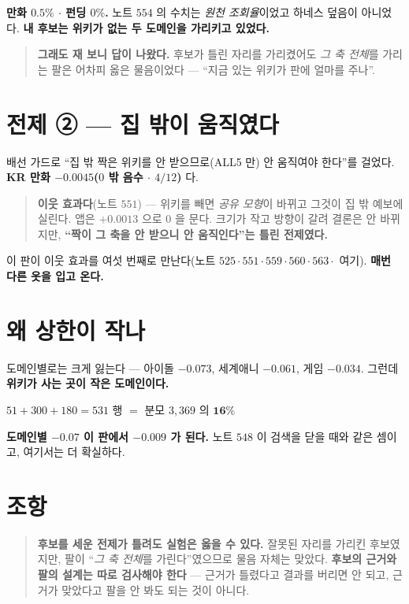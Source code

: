 \documentclass[11pt]{article}
\begin{document}
\textbf{만화 $0.5\%$ $\cdot$ 펀딩 $0\%$.} 노트 $554$ 의 수치는
\emph{원천 조회율}이었고 하네스 덮음이 아니었다. \textbf{내 후보는 위키가
없는 두 도메인을 가리키고 있었다.}

\begin{quote}
\textbf{그래도 재 보니 답이 나왔다.} 후보가 틀린 자리를 가리켰어도
\emph{그 축 전체}를 가리는 팔은 어차피 옳은 물음이었다 ---
``지금 있는 위키가 판에 얼마를 주나''.
\end{quote}

\section{전제 ② --- 집 밖이 움직였다}

배선 가드로 ``집 밖 짝은 위키를 안 받으므로(ALL5 만) 안 움직여야 한다''를
걸었다. \textbf{KR 만화 $-0.0045$($0$ 밖 음수 $\cdot$ $4/12$)} 다.

\begin{quote}
\textbf{이웃 효과다}(노트 $551$) --- 위키를 빼면 \emph{공유 모형}이 바뀌고
그것이 집 밖 예보에 실린다. 앱은 $+0.0013$ 으로 $0$ 을 문다. 크기가 작고
방향이 갈려 결론은 안 바뀌지만, \textbf{``짝이 그 축을 안 받으니 안
움직인다''는 틀린 전제였다.}
\end{quote}

이 판이 이웃 효과를 여섯 번째로 만난다(노트 $525 \cdot 551 \cdot 559
\cdot 560 \cdot 563 \cdot$ 여기). \textbf{매번 다른 옷을 입고 온다.}

\section{왜 상한이 작나}

도메인별로는 크게 잃는다 --- 아이돌 $-0.073$, 세계애니 $-0.061$, 게임
$-0.034$. 그런데 \textbf{위키가 사는 곳이 작은 도메인이다.}

\begin{center}
$51 + 300 + 180 = 531$ 행 $=$ 분모 $3{,}369$ 의 $\mathbf{16\%}$
\end{center}

\textbf{도메인별 $-0.07$ 이 판에서 $-0.009$ 가 된다.} 노트 $548$ 이 검색을
닫을 때와 같은 셈이고, 여기서는 더 확실하다.

\section*{조항}

\begin{quote}
\textbf{후보를 세운 전제가 틀려도 실험은 옳을 수 있다.} 잘못된 자리를
가리킨 후보였지만, 팔이 ``\emph{그 축 전체}를 가린다''였으므로 물음 자체는
맞았다. \textbf{후보의 근거와 팔의 설계는 따로 검사해야 한다} ---
근거가 틀렸다고 결과를 버리면 안 되고, 근거가 맞았다고 팔을 안 봐도 되는
것이 아니다.
\end{quote}
\end{document}

